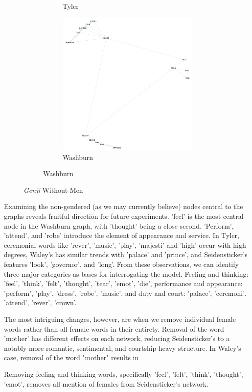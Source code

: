 \documentclass[12pt]{article}
\begin{document}
\begin{flushleft}
\begin{spacing}{2.0}
\begin{figure}
\begin{subfigure}{\linewidth}
\begin{subfigure}{.5\linewidth}
	  		\caption{Tyler}		
		\end{subfigure}
		\begin{subfigure}{.5\linewidth}
	  		\includegraphics[width=3in]{washburn-no-menwords.png}\hfill
	  		\caption{Washburn}		
		\end{subfigure}
	\end{subfigure}
	\caption{\textit{Genji} Without Men}
	\label{networks-without-men}
\end{figure}

Examining the non-gendered (as we may currently believe) nodes central to the graphs reveals fruitful direction for future experiments. 'feel' is the most central node in the Washburn graph, with 'thought' being a close second. 'Perform', 'attend', and 'robe' introduce the element of appearance and service. In Tyler, ceremonial words like 'rever', 'music', 'play', 'majesti' and 'high' occur with high degrees, Waley's has similar trends with 'palace' and 'prince', and Seidensticker's features 'look', 'governor', and 'long'. From these observations, we can identify three major categories as bases for interrogating the model. Feeling and thinking: 'feel', 'think', 'felt', 'thought', 'tear', 'emot', 'die', performance and appearance: 'perform', 'play', 'dress', 'robe', 'music', and duty and court: 'palace', 'ceremoni', 'attend', 'rever', 'crown'.



The most intriguing changes, however, are when we remove individual female words rather than all female words in their entirety. Removal of the word 'mother' has different effects on each network, reducing Seidensticker's to a notably more romantic, sentimental, and courtship-heavy structure. In Waley's case, removal of the word "mother" results in

Removing feeling and thinking words, specifically 'feel', 'felt', 'think', 'thought', 'emot', removes all mention of females from Seidensticker's network.


\end{spacing}
\end{flushleft}
\end{document}
